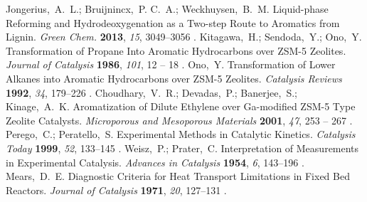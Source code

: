 \documentclass[journal=iecred,manuscript=article]{achemso}
\begin{document}
{\begin{mcitethebibliography}
Jongerius,~A.~L.; Bruijnincx,~P. C.~A.; Weckhuysen,~B.~M. Liquid-phase
  Reforming and Hydrodeoxygenation as a Two-step Route to Aromatics from
  Lignin. \emph{Green Chem.} \textbf{2013}, \emph{15}, 3049--3056\relax
\mciteBstWouldAddEndPuncttrue
\mciteSetBstMidEndSepPunct{\mcitedefaultmidpunct}
{\mcitedefaultendpunct}{\mcitedefaultseppunct}\relax
\unskip.
Kitagawa,~H.; Sendoda,~Y.; Ono,~Y. Transformation of Propane Into Aromatic
  Hydrocarbons over ZSM-5 Zeolites. \emph{Journal of Catalysis} \textbf{1986},
  \emph{101}, 12 -- 18\relax
\mciteBstWouldAddEndPuncttrue
\mciteSetBstMidEndSepPunct{\mcitedefaultmidpunct}
{\mcitedefaultendpunct}{\mcitedefaultseppunct}\relax
\unskip.
Ono,~Y. Transformation of Lower Alkanes into Aromatic Hydrocarbons over ZSM-5
  Zeolites. \emph{Catalysis Reviews} \textbf{1992}, \emph{34}, 179--226\relax
\mciteBstWouldAddEndPuncttrue
\mciteSetBstMidEndSepPunct{\mcitedefaultmidpunct}
{\mcitedefaultendpunct}{\mcitedefaultseppunct}\relax
\unskip.
Choudhary,~V.~R.; Devadas,~P.; Banerjee,~S.; Kinage,~A.~K. Aromatization of
  Dilute Ethylene over Ga-modified ZSM-5 Type Zeolite Catalysts.
  \emph{Microporous and Mesoporous Materials} \textbf{2001}, \emph{47}, 253 --
  267\relax
\mciteBstWouldAddEndPuncttrue
\mciteSetBstMidEndSepPunct{\mcitedefaultmidpunct}
{\mcitedefaultendpunct}{\mcitedefaultseppunct}\relax
\unskip.
Perego,~C.; Peratello,~S. Experimental Methods in Catalytic Kinetics.
  \emph{Catalysis Today} \textbf{1999}, \emph{52}, 133--145\relax
\mciteBstWouldAddEndPuncttrue
\mciteSetBstMidEndSepPunct{\mcitedefaultmidpunct}
{\mcitedefaultendpunct}{\mcitedefaultseppunct}\relax
\unskip.
Weisz,~P.; Prater,~C. Interpretation of Measurements in Experimental Catalysis.
  \emph{Advances in Catalysis} \textbf{1954}, \emph{6}, 143--196\relax
\mciteBstWouldAddEndPuncttrue
\mciteSetBstMidEndSepPunct{\mcitedefaultmidpunct}
{\mcitedefaultendpunct}{\mcitedefaultseppunct}\relax
\unskip.
Mears,~D.~E. Diagnostic Criteria for Heat Transport Limitations in Fixed Bed
  Reactors. \emph{Journal of Catalysis} \textbf{1971}, \emph{20},
  127--131\relax
\mciteBstWouldAddEndPuncttrue
\mciteSetBstMidEndSepPunct{\mcitedefaultmidpunct}
{\mcitedefaultendpunct}{\mcitedefaultseppunct}\relax
\unskip.

\end{mcitethebibliography}}
\end{document}
